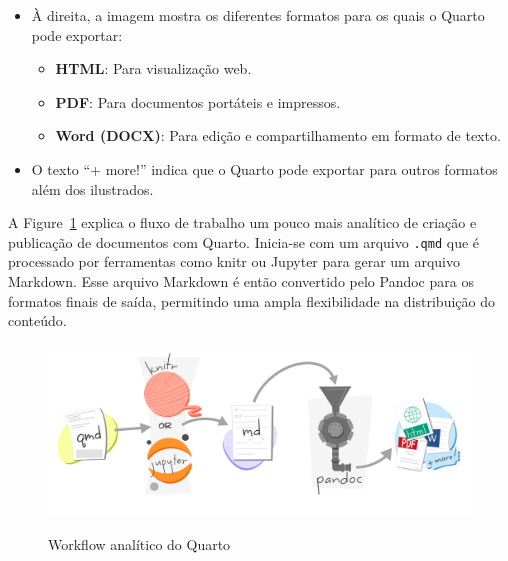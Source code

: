 \documentclass[
  a4paper,
]{article}
\providecommand{\tightlist}{%
  \setlength{\itemsep}{0pt}\setlength{\parskip}{0pt}}\usepackage{longtable,booktabs,array}
\begin{document}
\begin{tcolorbox}
\begin{enumerate}
  \begin{itemize}
  \tightlist
  \item
    À direita, a imagem mostra os diferentes formatos para os quais o
    Quarto pode exportar:

    \begin{itemize}
    \tightlist
    \item
      \textbf{HTML}: Para visualização web.
    \item
      \textbf{PDF}: Para documentos portáteis e impressos.
    \item
      \textbf{Word (DOCX)}: Para edição e compartilhamento em formato de
      texto.
    \end{itemize}
  \item
    O texto ``+ more!'' indica que o Quarto pode exportar para outros
    formatos além dos ilustrados.
  \end{itemize}
\end{enumerate}

\end{tcolorbox}

A Figure~\ref{fig-quarto-process} explica o fluxo de trabalho um pouco
mais analítico de criação e publicação de documentos com Quarto.
Inicia-se com um arquivo \texttt{.qmd} que é processado por ferramentas
como knitr ou Jupyter para gerar um arquivo Markdown. Esse arquivo
Markdown é então convertido pelo Pandoc para os formatos finais de
saída, permitindo uma ampla flexibilidade na distribuição do conteúdo.

\begin{figure}

\href{https://r-cubed-advanced.rostools.org/sessions/build-website}{\includegraphics{img/quarto-process.png}}

\caption{\label{fig-quarto-process}Workflow analítico do Quarto}

\end{figure}%
\end{document}
